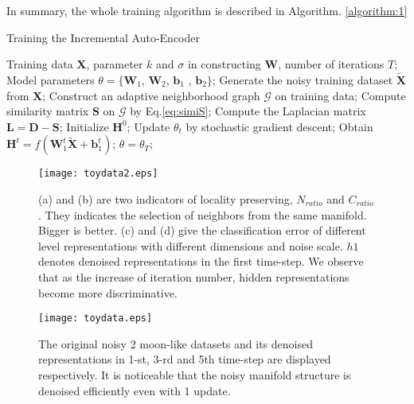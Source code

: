 \documentclass{article}
\def \bb{\mathbf b}
\def \D{\mathbf D}
\def \HH{\mathbf H}
\def \LL{\mathbf L}
\def \SSS{\mathbf S}
\def \W{\mathbf W}
\def \X{\mathbf X}
\def \GM{{\mathcal G}}
\begin{document}
In summary, the whole training algorithm is described in Algorithm. \ref{algorithm:1}
\begin{algorithm}[htb]
  \caption{Training the Incremental Auto-Encoder}
  \begin{algorithmic}[1]
    \REQUIRE Training data $\X$,  parameter $k$ and $\sigma$ in constructing $\W$, number of iterations $T$;
    \ENSURE Model parameters $\theta = \{\W_1$, $\W_2$, $\bb_1$ , $\bb_2\}$;
    \STATE Generate the noisy training dataset $\tilde{\X}$ from $\X$;
    \STATE Construct an adaptive neighborhood graph $\GM$ on training data;
    \STATE Compute similarity matrix $\SSS$ on $\GM$ by Eq.\ref{eq:simiS};
    \STATE Compute the Laplacian matrix $\LL = \D - \SSS$;
    \STATE Initialize $\HH^0$;
       \STATE Update $\theta_t$ by stochastic gradient descent;
       \STATE Obtain $\HH^t = f({\W_1^t \tilde{\X} + \bb_1^t})$;
    \ENDFOR
    \STATE $\theta = \theta_T$;
  \end{algorithmic}
  \label{algorithm:1}
\end{algorithm}


\begin{figure*}[t]
\begin{center}
   \texttt{[image: toydata2.eps]}
\end{center}
   \caption{(a) and (b) are two indicators of locality preserving, $N_{ratio}$ and $C_{ratio}$. They indicates the selection of neighbors from the same manifold. Bigger is better. (c) and (d) give the classification error of different level representations with different dimensions and noise scale. $h1$ denotes denoised representations in the first time-step. We observe that as the increase of iteration number, hidden representations become more discriminative.}
\label{fig:toydata2}
\end{figure*}
\begin{figure*}[t]
\begin{center}
   \texttt{[image: toydata.eps]}
\end{center}
   \caption{The original noisy 2 moon-like datasets and its denoised representations in 1-st, 3-rd and 5th time-step are displayed respectively. It is noticeable that the noisy manifold structure is denoised efficiently even with 1 update.}
\label{fig:toydata}
\end{figure*}
\end{document}
